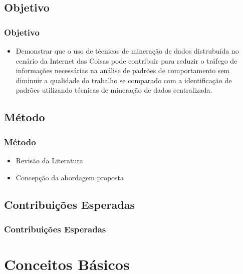 \documentclass[hyperref={pdfpagelabels=false}]{beamer}
\begin{document}
\subsection{Objetivo}
 
\begin{frame}
	\frametitle{Objetivo}

	\begin{itemize}
		\item Demonstrar que o uso de t\'{e}cnicas de minera\c{c}\~{a}o de dados distrubu\'{i}da no cenário da Internet das Coisas pode contribuir para reduzir o tráfego de informações necessárias na análise de padrões de comportamento sem diminuir a qualidade do trabalho se comparado com a identificação de padrões utilizando técnicas de mineração de dados centralizada. 
	\end{itemize}

\end{frame}

\subsection{Método}  

\begin{frame}
	\frametitle{Método}
     \begin{itemize}
        	\item Revisão da Literatura
            \item Concepção da abordagem proposta
		\end{itemize}

\end{frame}
    
\subsection{Contribuições Esperadas}  

\begin{frame}
	\frametitle{Contribuições Esperadas}

\end{frame}
   

\section{Conceitos Básicos}
\end{document}
